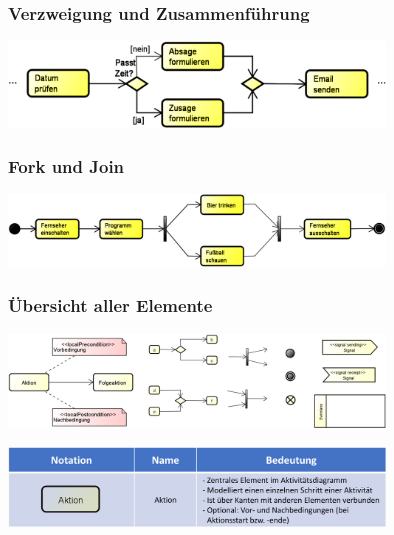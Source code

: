 \documentclass[11pt, a4paper]{article}
\begin{document}
\vspace{2em}

\raggedright \subsubsection{Verzweigung und Zusammenführung}

\centering
\includegraphics[width=0.75\textwidth]{Aktivitaet-03.png}

\vspace{2em}

\raggedright \subsubsection{Fork und Join}

\centering
\includegraphics[width=0.75\textwidth]{Aktivitaet-02.png}

\vspace{2em}

\raggedright \subsubsection{Übersicht aller Elemente}

\centering
\includegraphics[width=0.75\textwidth]{Aktivitaet-01.png}

\newpage

\centering
\includegraphics[width=0.75\textwidth]{Aktivitaet-Tabellen/1.png}
\end{document}
